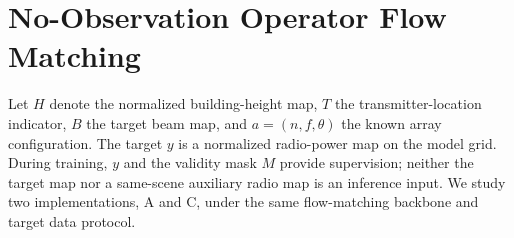\section{No-Observation Operator Flow Matching}
Let $H$ denote the normalized building-height map, $T$ the transmitter-location
indicator, $B$ the target beam map, and $a=(n,f,\theta)$ the known array
configuration. The target $y$ is a normalized radio-power map on the model
grid. During training, $y$ and the validity mask $M$ provide supervision;
neither the target map nor a same-scene auxiliary radio map is an inference
input. We study two implementations, A and C, under the same flow-matching
backbone and target data protocol.

